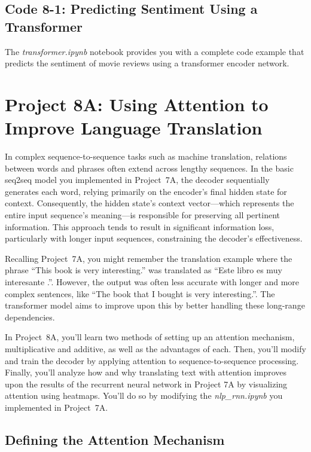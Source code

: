 \subsection{Code 8-1: Predicting Sentiment Using a Transformer}

The \emph{transformer.ipynb} notebook provides you with a complete code example that predicts the sentiment of movie reviews using a transformer encoder network.

\section{Project 8A: Using Attention to Improve Language Translation}

In complex sequence-to-sequence tasks such as machine translation, relations between words and phrases often extend across lengthy sequences. In the basic seq2seq model you implemented in Project~7A, the decoder sequentially generates each word, relying primarily on the encoder's final hidden state for context. Consequently, the hidden state's context vector---which represents the entire input sequence’s meaning---is responsible for preserving all pertinent information. This approach tends to result in significant information loss, particularly with longer input sequences, constraining the decoder’s effectiveness.

Recalling Project~7A, you might remember the translation example where the phrase ``This book is very interesting.'' was translated as ``Este libro es muy interesante .''. However, the output was often less accurate with longer and more complex sentences, like ``The book that I bought is very interesting.''. The transformer model aims to improve upon this by better handling these long-range dependencies.

In Project~8A, you'll learn two methods of setting up an attention mechanism, multiplicative and additive, as well as the advantages of each.  Then, you'll modify and train the decoder by applying attention to sequence-to-sequence processing. Finally, you'll analyze how and why translating text with attention improves upon the results of the recurrent neural network in Project 7A by visualizing attention using heatmaps.
You'll do so by modifying the \emph{nlp\_rnn.ipynb} you implemented in Project~7A.

\subsection{Defining the Attention Mechanism}

